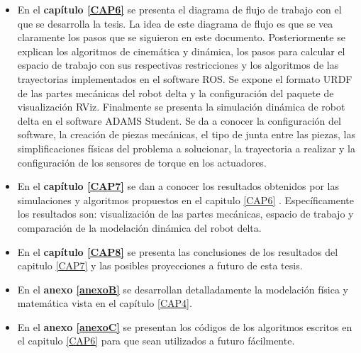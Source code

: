 \begin{itemize}
    \item {En el \textbf{capítulo \eqref{CAP6}} se presenta el diagrama de flujo de trabajo con el que se desarrolla la tesis. La idea de este diagrama de flujo es que se vea claramente los pasos que se siguieron en este documento. Posteriormente se explican los algoritmos de cinemática y dinámica, los pasos para calcular el espacio de trabajo con sus respectivas restricciones y los algoritmos de las trayectorias implementados en el software ROS. Se expone el formato URDF de las partes mecánicas del robot delta y la configuración del paquete de visualización RViz. Finalmente se presenta la simulación dinámica de robot delta en el software ADAMS Student. Se da a conocer la configuración del software, la creación de piezas mecánicas, el tipo de junta entre las piezas, las simplificaciones físicas del problema a solucionar, la trayectoria a realizar y la configuración de los sensores de torque en los actuadores.}
    \item {En el \textbf{capítulo \eqref{CAP7}} se dan a conocer los resultados obtenidos por las simulaciones y algoritmos propuestos en el capitulo \eqref{CAP6} . Específicamente los resultados son: visualización de las partes mecánicas, espacio de trabajo y comparación de la modelación dinámica del robot delta.}
    \item {En el \textbf{capítulo \eqref{CAP8}} se presenta las conclusiones de los resultados del capitulo \eqref{CAP7} y las posibles proyecciones a futuro de esta tesis.}
    \item {En el \textbf{anexo \eqref{anexoB}} se desarrollan detalladamente la modelación física y matemática vista en el capítulo \eqref{CAP4}.} 
    \item {En el \textbf{anexo \eqref{anexoC}} se presentan los códigos de los algoritmos escritos en el capitulo \eqref{CAP6} para que sean utilizados a futuro fácilmente.} 
    \end{itemize}
